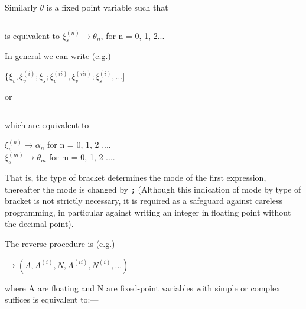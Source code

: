 \documentclass[10pt, a4paper, oneside]{article}
\newcommand{\mytt}[1]{\texttt{\scriptsize #1}}
\newcommand{\mytt}[1]{\texttt{\small #1}}
\begin{document}
\begin{multicols}{2}
Similarly $\theta$ is a fixed point variable such that

\begin{addmargin}[1cm]{1em}%
\begin{math}
[\xi_{s}, \xi_{s}^{(i)}, \xi_{s}^{(ii)}, \xi_{s}^{(iii)}, \ldots ]
\end{math}
\end{addmargin}

is equivalent to $\xi_{s}^{(n)} \rightarrow \theta_{n}$, for n = 0, 1, 2...

In general we can write (e.g.)

\begin{addmargin}[1cm]{1em}%
\begin{math}
\{\xi_{v}, \xi_{v}^{(i)}; \xi_{s}; \xi_{v}^{(ii)}, \xi_{v}^{(iii)}; \xi_{s}^{(i)}, \ldots ]
\end{math}
\end{addmargin}

or

\begin{addmargin}[1cm]{1em}%
\begin{math}
[\xi_{s}; \xi_{v}, \xi_{v}^{(i)}; \xi_{s}^{(i)}, \xi_{s}^{(ii)}, \ldots ]
\end{math}
\end{addmargin}

which are equivalent to

\begin{addmargin}[1cm]{1em}%
$\xi_{v}^{(n)} \rightarrow \alpha_{n}$ for n = 0, 1, 2 .... \\
$\xi_{s}^{(m)} \rightarrow \theta_{m}$ for m = 0, 1, 2 .... \\
\end{addmargin}

That is, the type of bracket determines the mode of the
first expression, thereafter the mode is changed by \mytt{;}
(Although this indication of mode by type of bracket
is not strictly necessary, it is required as a safeguard
against careless programming, in particular against
writing an integer in floating point without the
decimal point).

The reverse procedure is (e.g.)

\begin{addmargin}[1cm]{1em}%
\begin{math}
\rightarrow(A,A^{(i)},N,A^{(ii)},N^{(i)}, \ldots)
\end{math}
\end{addmargin}

where A are floating and N are fixed-point variables
with simple or complex suffices is equivalent to:—


\end{multicols}
\end{document}
